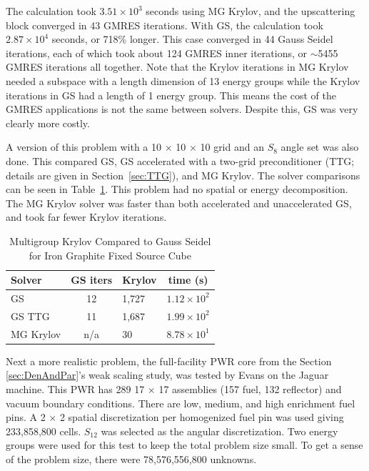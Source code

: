 The calculation took $3.51 \times 10^{3}$ seconds using MG Krylov, and the upscattering block converged in 43 GMRES iterations. With GS, the calculation took $2.87 \times 10^{4}$ seconds, or 718\% longer. This case converged in 44 Gauss Seidel iterations, each of which took about 124 GMRES inner iterations, or $\sim$5455 GMRES iterations all together. Note that the Krylov iterations in MG Krylov needed a subspace with a length dimension of 13 energy groups while the Krylov iterations in GS had a length of 1 energy group. This means the cost of the GMRES applications is not the same between solvers. Despite this, GS was very clearly more costly.

A version of this problem with a 10 $\times$ 10 $\times$ 10 grid and an $S_{8}$ angle set was also done. This compared GS, GS accelerated with a two-grid preconditioner (TTG; details are given in Section~\ref{sec:TTG}), and MG Krylov. The solver comparisons can be seen in Table~\ref{table:FeC GS Krylov}. This problem had no spatial or energy decomposition. The MG Krylov solver was faster than both accelerated and unaccelerated GS, and took far fewer Krylov iterations. 
%
\begin{table}[!h]
\caption{Multigroup Krylov Compared to Gauss Seidel for Iron Graphite Fixed Source Cube}
\begin{center}
\begin{tabular}{l c l c}
\hline
Solver & GS iters & Krylov & time (s)\\[0.5ex]
\hline
GS &  12 & 1,727 & $1.12 \times 10^{2}$ \\
GS TTG & 11 & 1,687 & $1.99 \times 10^{2}$  \\
MG Krylov & n/a & 30 & $8.78 \times 10^{1}$ \\
\hline
\end{tabular}
\end{center}
\label{table:FeC GS Krylov}
\end{table}

Next a more realistic problem, the full-facility PWR core from the Section \ref{sec:DenAndPar}'s weak scaling study, was tested by Evans on the Jaguar machine. This PWR has 289 17 $\times$ 17 assemblies (157 fuel, 132 reflector) and vacuum boundary conditions. There are low, medium, and high enrichment fuel pins. A 2 $\times$ 2 spatial discretization per homogenized fuel pin was used giving 233,858,800 cells. $S_{12}$ was selected as the angular discretization. Two energy groups were used for this test to keep the total problem size small. To get a sense of the problem size, there were 78,576,556,800 unknowns.

